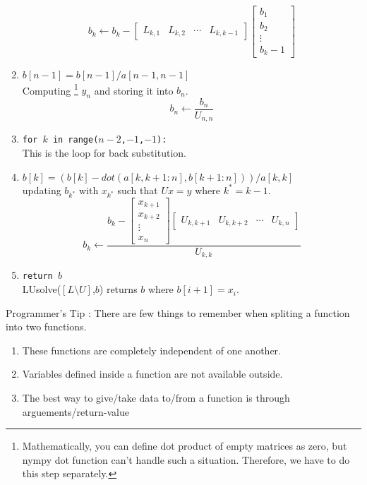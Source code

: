 \begin{commentary}
\begin{enumerate}[label=Line \arabic*]
	\[ b_k \leftarrow b_k - \begin{bmatrix} L_{k,1} & L_{k,2} & \cdots & L_{k,k-1} \end{bmatrix} \begin{bmatrix} b_1 \\ b_2 \\ \vdots \\ b_k-1 \end{bmatrix} \]
	\item \texttt{$b[n-1] = b[n-1]/a[n-1,n-1]$} \\ Computing
		\footnote{
			Mathematically, you can define dot product of empty matrices as zero, but nympy dot function can't handle such a situation.
		Therefore, we have to do this step separately.
		}
		$y_n$ and storing it into $b_n$.
	\[b_n \leftarrow \frac{b_n}{U_{n,n}}\]
	\item \texttt{for $k$ in range($n-2$,$-1$,$-1$):}  \\ This is the loop for back substitution.
	\item \texttt{$b[k] = (b[k] - dot(a[k,k+1:n],b[k+1:n]))/a[k,k]$} \\ updating $b_{k^*}$ with $x_{k^*}$ such that $Ux = y$ where $k^* = k-1$.
	\[ b_k \leftarrow \frac{b_k - \begin{bmatrix} x_{k+1} \\ x_{k+2} \\ \vdots \\ x_n \end{bmatrix} \begin{bmatrix} U_{k,k+1} & U_{k,k+2} & \cdots & U_{k,n} \end{bmatrix}}{U_{k,k}} \]
	\item \texttt{return $b$} \\ LUsolve($[L\text{\textbackslash{}}U]$,$b$) returns $b$ where $b[i+1]=x_i$.
\end{enumerate}

	Programmer's Tip : There are few things to remember when spliting a function into two functions.
\begin{enumerate}
	\item These functions are completely independent of one another.
	\item Variables defined inside a function are not available outside.
	\item The best way to give/take data to/from a function is through arguements/return-value
\end{enumerate}


\end{commentary}
